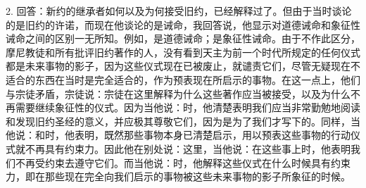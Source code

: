 2. 回答：新约的继承者如何以及为何接受旧约，已经解释过了。但由于当时谈论的是旧约的许诺，而现在他谈论的是诫命，我回答说，他显示对道德诫命和象征性诫命之间的区别一无所知。例如，是道德诫命；是象征性诫命。由于不作此区分，摩尼教徒和所有批评旧约著作的人，没有看到天主为前一个时代所规定的任何仪式都是未来事物的影子，因为这些仪式现在已被废止，就谴责它们，尽管无疑现在不适合的东西在当时是完全适合的，作为预表现在所启示的事物。在这一点上，他们与宗徒矛盾，宗徒说：宗徒在这里解释为什么这些著作应当被接受，以及为什么不再需要继续象征性的仪式。因为当他说：时，他清楚表明我们应当非常勤勉地阅读和发现旧约圣经的意义，并应极其尊敬它们，因为是为了我们才写下的。同样，当他说：和时，他表明，既然那些事物本身已清楚启示，用以预表这些事物的行动仪式就不再具有约束力。因此他在别处说：这里，当他说：在这些事上时，他表明我们不再受约束去遵守它们。而当他说：时，他解释这些仪式在什么时候具有约束力，即在那些现在完全向我们启示的事物被这些未来事物的影子所象征的时候。\par


